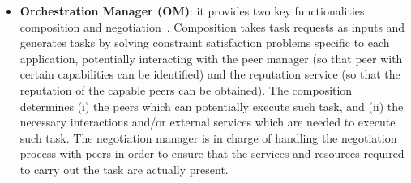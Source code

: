 \begin{itemize}

\item \textbf{Orchestration Manager (OM)}: it provides two key functionalities: composition and negotiation~\cite{D6.2}. Composition takes task requests as inputs and generates tasks by solving constraint satisfaction problems specific to each application, potentially interacting with the peer manager (so that peer with certain capabilities can be identified) and the reputation service (so that the reputation of the capable peers can be obtained). The composition determines (i) the peers which can potentially execute such task, and (ii) the necessary interactions and/or external services which are needed to execute such task.  The negotiation manager is in charge of handling the negotiation process with peers in order to ensure that the services and resources required to carry out the task are actually present. %


\end{itemize}
